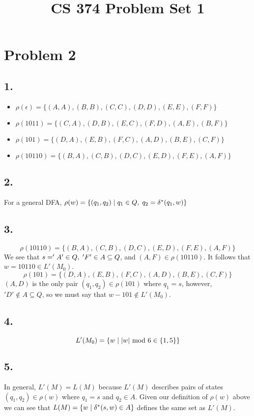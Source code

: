 \documentclass[11pt]{article}
\title{\textbf{CS 374 Problem Set 1}}
\date{}
\begin{document}
\maketitle

\section*{Problem 2}
\subsection*{1.}
\begin{itemize}
	\item $\rho(\epsilon)=\{(A,A),(B,B),(C,C),(D,D),(E,E),(F,F)\}$
	\item $\rho(1011)=\{(C,A),(D,B),(E,C),(F,D),(A,E),(B,F)\}$
	\item $\rho(101)=\{(D,A),(E,B),(F,C),(A,D),(B,E),(C,F)\}$
	\item $\rho(10110)=\{(B,A),(C,B),(D,C),(E,D),(F,E),(A,F)\}$
\end{itemize}
\subsection*{2.}
For a general DFA, $\rho(w)=\{(q_1,q_2)\hspace{1mm}|\hspace{1mm}q_1\in Q,\hspace{1mm}q_2=\delta^*(q_1,w)\}$
\subsection*{3.}
\[\rho(10110)=\{(B,A),(C,B),(D,C),(E,D),(F,E),(A,F)\}\]
We see that $s='A'\in Q,\hspace{1mm}'F'\in A\subseteq Q$, and $(A,F)\in \rho(10110)$. It follows that $w=10110\in L'(M_0)$.
\[\rho(101)=\{(D,A),(E,B),(F,C),(A,D),(B,E),(C,F)\}\]
$(A,D)$ is the only pair $(q_1,q_2)\in\rho(101)$ where $q_1=s$, however, $'D'\notin A\subseteq Q$, so we must say that $w-101\notin L'(M_0)$.
\subsection*{4.}
\[L'(M_0)=\{w\hspace{1mm}|\hspace{1mm}|w|\text{ mod }6\in\{1,5\}\}\]
\subsection*{5.}
In general, $L'(M)=L(M)$ because $L'(M)$ describes pairs of states $(q_1,q_2)\in\rho(w)$ where $q_1=s$ and $q_2\in A$. Given our definition of $\rho(w)$ above we can see that $L(M)=\{w\hspace{1mm}|\hspace{1mm}\delta^*(s,w)\in A\}$ defines the same set as $L'(M)$.
\end{document}
